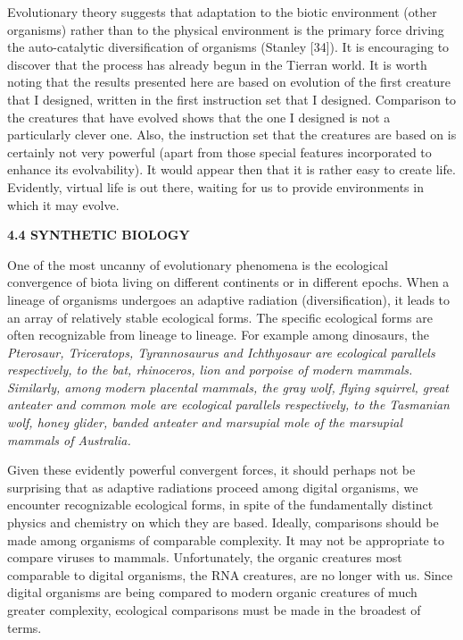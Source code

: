 Evolutionary theory suggests that adaptation to the biotic environment (other
organisms) rather than to the physical environment is the primary force
driving the auto-catalytic diversification of organisms (Stanley [34]).  It
is encouraging to discover that the process has already begun in the Tierran
world.  It is worth noting that the results presented here are based on
evolution of the first creature that I designed, written in the first
instruction set that I designed.  Comparison to the creatures that have
evolved shows that the one I designed is not a particularly clever one.  Also,
the instruction set that the creatures are based on is certainly not very
powerful (apart from those special features incorporated to enhance its
evolvability).  It would appear then that it is rather easy to create life.
Evidently, virtual life is out there, waiting for us to provide environments
in which it may evolve.

\LP
\bf 4.4 SYNTHETIC BIOLOGY\rm
\eLP

One of the most uncanny of evolutionary phenomena is the ecological convergence
of biota living on different continents or in different epochs.  When a
lineage of organisms undergoes an adaptive radiation (diversification),
it leads to an array of relatively stable ecological forms.  The specific
ecological forms are often recognizable from lineage to lineage.  For example
among dinosaurs, the \it Pterosaur\rm, \it Triceratops\rm,
\it Tyrannosaurus \rm and \it Ichthyosaur \rm
are ecological parallels respectively, to the bat, rhinoceros, lion and
porpoise of modern mammals.  Similarly, among modern placental mammals, the
gray wolf, flying squirrel, great anteater and common mole are ecological
parallels respectively, to the Tasmanian wolf, honey glider, banded anteater
and marsupial mole of the marsupial mammals of Australia.

Given these evidently powerful convergent forces, it should perhaps not be
surprising that as adaptive radiations proceed among digital organisms, we
encounter recognizable ecological forms, in spite of the fundamentally
distinct physics and chemistry on which they are based.  Ideally, comparisons
should be made among organisms of comparable complexity.  It may not be
appropriate to compare viruses to mammals.  Unfortunately, the organic
creatures most comparable to digital organisms, the RNA creatures, are no
longer with us.  Since digital organisms are being compared to modern organic
creatures of much greater complexity, ecological comparisons must be made in
the broadest of terms.

